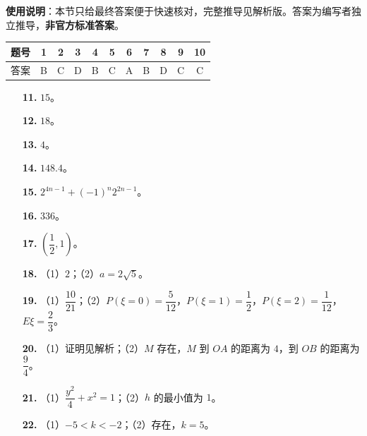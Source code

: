 
\begin{gknotice}
\textbf{使用说明}：本节只给最终答案便于快速核对，完整推导见解析版。答案为编写者独立推导，\textbf{非官方标准答案}。
\end{gknotice}

\begin{center}\begin{tabular}{ccccccccccc}
\toprule
题号 & 1 & 2 & 3 & 4 & 5 & 6 & 7 & 8 & 9 & 10 \\
\midrule
答案 & B & C & D & B & C & A & B & D & C & C \\
\bottomrule
\end{tabular}\end{center}

\begin{itemize}[leftmargin=2.6em]
  \item[\textbf{11.}] $15$。
  \item[\textbf{12.}] $18$。
  \item[\textbf{13.}] $4$。
  \item[\textbf{14.}] $148.4$。
  \item[\textbf{15.}] $2^{4n-1}+(-1)^n2^{2n-1}$。
  \item[\textbf{16.}] $336$。
  \item[\textbf{17.}] $\left(\dfrac12,1\right)$。
\end{itemize}

\begin{itemize}[leftmargin=2.6em]
  \item[\textbf{18.}] （1）$2$；（2）$a=2\sqrt5$。
  \item[\textbf{19.}] （1）$\dfrac{10}{21}$；（2）$P(\xi=0)=\dfrac{5}{12}$，$P(\xi=1)=\dfrac12$，$P(\xi=2)=\dfrac1{12}$，$E\xi=\dfrac23$。
  \item[\textbf{20.}] （1）证明见解析；（2）$M$ 存在，$M$ 到 $OA$ 的距离为 $4$，到 $OB$ 的距离为 $\dfrac94$。
  \item[\textbf{21.}] （1）$\dfrac{y^2}{4}+x^2=1$；（2）$h$ 的最小值为 $1$。
  \item[\textbf{22.}] （1）$-5<k<-2$；（2）存在，$k=5$。
\end{itemize}
